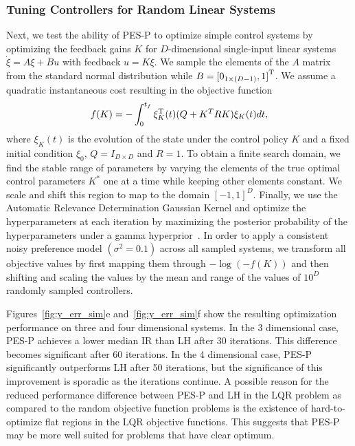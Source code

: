\subsubsection{Tuning Controllers for Random Linear Systems}
Next, we test the ability of PES-P to optimize simple control systems by
optimizing the feedback gains $K$ for $D$-dimensional single-input linear
systems $\dot{\xi} = A \xi + Bu$ with feedback $u = K \xi$. We sample the
elements of the $A$ matrix from the standard normal distribution while $B =
{[0_{1 \times (D-1)}, 1]}^{\mathrm{T}}$. We assume a quadratic instantaneous cost
resulting in the objective function
\begin{equation}
    f(K) = - \int_0^{t_f} \xi_K^{\mathrm{T}}(t) (Q + K^T R K) \xi_K(t) dt,
\end{equation}
where $\xi_K(t)$ is the evolution of the state under the control policy $K$ and
a fixed initial condition $\xi_0$, $Q = I_{D \times D}$ and $R = 1$. To obtain a
finite search domain, we find the stable range of parameters by varying the
elements of the true optimal control parameters $K^*$ one at a time while
keeping other elements constant. We scale and shift this region to map to the
domain ${[-1, 1]}^D$. Finally, we use the Automatic Relevance Determination
Gaussian Kernel and optimize the hyperparameters at each iteration by maximizing
the posterior probability of the hyperparameters under a gamma
hyperprior~\citep{chu2005preference,
williams2006gaussian}. In order to apply a consistent noisy preference model
$(\sigma^2 = 0.1)$ across all sampled systems, we transform all objective values
by first mapping them through $-\log(-f(K))$ and then shifting and scaling the
values by the mean and range of the values of $10^D$ randomly sampled
controllers. 

Figures~\ref{fig:y_err_sim}e and~\ref{fig:y_err_sim}f show the resulting
optimization performance on three and four dimensional systems. In the 3
dimensional case, PES-P achieves a lower median IR than LH after 30 iterations.
This difference becomes significant after 60 iterations. In the 4 dimensional
case, PES-P significantly outperforms LH after 50 iterations, but the
significance of this improvement is sporadic as the iterations continue. A
possible reason for the reduced performance difference between PES-P and LH in
the LQR problem as compared to the random objective function problems is the
existence of hard-to-optimize flat regions in the LQR objective functions. This
suggests that PES-P may be more well suited for problems that have clear
optimum.
